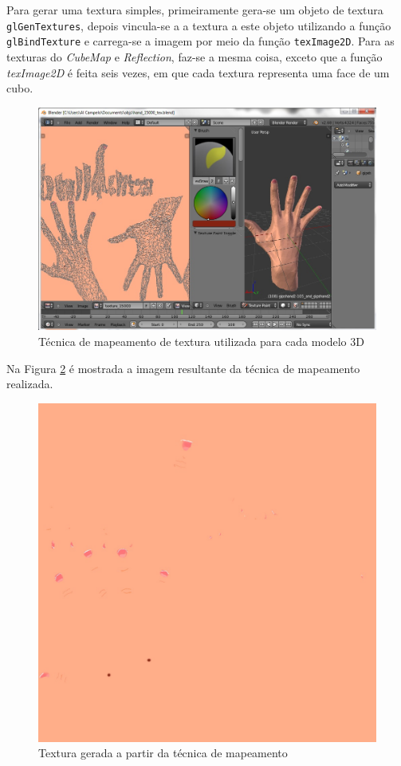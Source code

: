 	Para gerar uma textura simples, primeiramente gera-se um objeto de textura \texttt{glGenTextures}, depois vincula-se a a textura a este objeto utilizando a função \texttt{glBindTexture} e carrega-se a imagem por meio da função \texttt{texImage2D}.  Para as texturas do \textit{CubeMap} e \textit{Reflection}, faz-se a mesma coisa, exceto que a função \textit{texImage2D} é feita seis vezes, em que cada textura representa uma face de um cubo. 

	\begin{figure}[h]
	\centering
		\includegraphics[keepaspectratio=true,scale=0.6]{figuras/uvmap.jpg}
	\caption{Técnica de mapeamento de textura utilizada para cada modelo 3D}
	\label{uvmap}
	\end{figure}

	Na Figura  \ref{texture_uvmap} é mostrada a imagem resultante da técnica de mapeamento realizada.

	\begin{figure}[h]
	\centering
		\includegraphics[keepaspectratio=true,scale=0.2]{figuras/texture_uvmap.jpg}
	\caption{Textura gerada a partir da técnica de mapeamento}
	\label{texture_uvmap}
	\end{figure}

